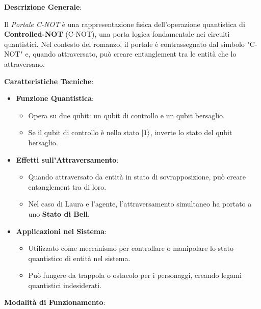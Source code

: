 \begin{tcolorbox}[fontupper=\footnotesize, fontlower=\Large,colback=white,colframe=black,title=\textbf{Portale C-NOT}]
\begin{multicols}{2}
\textbf{Descrizione Generale}:

Il \emph{Portale C-NOT} è una rappresentazione fisica dell'operazione quantistica di \textbf{Controlled-NOT} (C-NOT), una porta logica fondamentale nei circuiti quantistici. Nel contesto del romanzo, il portale è contrassegnato dal simbolo "C-NOT" e, quando attraversato, può creare entanglement tra le entità che lo attraversano.

\textbf{Caratteristiche Tecniche}:

\begin{itemize}
    \item \textbf{Funzione Quantistica}:
    \begin{itemize}
        \item Opera su due qubit: un qubit di controllo e un qubit bersaglio.
        \item Se il qubit di controllo è nello stato $\ket{1}$, inverte lo stato del qubit bersaglio.
    \end{itemize}
    \item \textbf{Effetti sull'Attraversamento}:
    \begin{itemize}
        \item Quando attraversato da entità in stato di sovrapposizione, può creare entanglement tra di loro.
        \item Nel caso di Laura e l'agente, l'attraversamento simultaneo ha portato a uno \textbf{Stato di Bell}.
    \end{itemize}
    \item \textbf{Applicazioni nel Sistema}:
    \begin{itemize}
        \item Utilizzato come meccanismo per controllare o manipolare lo stato quantistico di entità nel sistema.
        \item Può fungere da trappola o ostacolo per i personaggi, creando legami quantistici indesiderati.
    \end{itemize}
\end{itemize}

\textbf{Modalità di Funzionamento}:


\end{multicols}
\end{tcolorbox}
